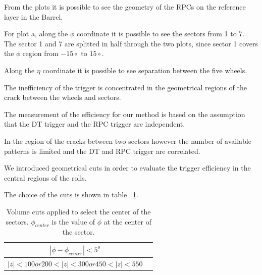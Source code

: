 From the plots it is possible to see the geometry of the RPCs on the reference layer 
in the Barrel.

For plot a, along the $\phi$ coordinate it is possible to see the sectors from 1 to 7.
The sector 1 and 7 are splitted in half through the two plots, since sector 1 covers the $\phi$
region from $-15\circ$ to $15\circ$. 

Along the $\eta$ coordinate it is possible to see separation between the five wheels. 

The inefficiency of the trigger is concentrated in the geometrical regions of the crack 
between the wheels and sectors.




The measurement of the efficiency for our method is based on the assumption that 
the DT trigger and the RPC trigger are independent.

In the region of the cracks between two sectors however the number of 
available patterns is limited and the DT and RPC trigger are correlated.

We introduced geometrical cuts in order to evaluate the trigger efficiency 
in the central regions of the rolls. 

The choice of the cuts is shown in table ~\ref{tab:volumecuts}. 





 \begin{table}[htb]
    \label{tab:volumecuts}
    \begin{center}
      \begin{tabular}{|c|c|} \hline
  $   |\phi - \phi_{center} | < 5^o $ & \\ \hline
  $  |z| < 100 or 200 < |z| < 300 or 450 < |z| < 550$  &  \\ \hline
      \end{tabular}
      \caption{Volume cuts applied to select the center of the sectors.
       $\phi_{center}$ is the value of $\phi$ at the center of the sector. 
}
    \end{center}
  \end{table}


